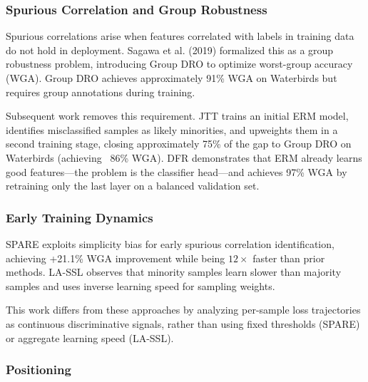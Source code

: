 
\subsubsection{Spurious Correlation and Group Robustness}

Spurious correlations arise when features correlated with labels in training data do not hold in deployment. Sagawa et al. (2019) formalized this as a group robustness problem, introducing Group DRO to optimize worst-group accuracy (WGA). Group DRO achieves approximately 91\% WGA on Waterbirds but requires group annotations during training.

Subsequent work removes this requirement. JTT \citep{liu2021jtt} trains an initial ERM model, identifies misclassified samples as likely minorities, and upweights them in a second training stage, closing approximately 75\% of the gap to Group DRO on Waterbirds (achieving ~86\% WGA). DFR \citep{izmailov2022feature} demonstrates that ERM already learns good features---the problem is the classifier head---and achieves 97\% WGA by retraining only the last layer on a balanced validation set.

\subsubsection{Early Training Dynamics}

SPARE \citep{Yang2023} exploits simplicity bias for early spurious correlation identification, achieving +21.1\% WGA improvement while being $12\times$ faster than prior methods. LA-SSL \citep{zhu2023lassl} observes that minority samples learn slower than majority samples and uses inverse learning speed for sampling weights.

This work differs from these approaches by analyzing per-sample loss trajectories as continuous discriminative signals, rather than using fixed thresholds (SPARE) or aggregate learning speed (LA-SSL).

\subsubsection{Positioning}

\begin{table}[htbp]
\centering
{}
\end{table}

